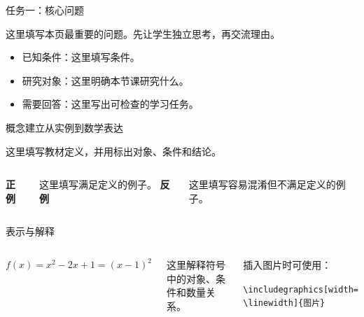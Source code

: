\documentclass[UTF8,aspectratio=169,11pt]{ctexbeamer}
\title{\CourseTitle}
\author{\TeacherName}
\date{\LessonDate}
\begin{document}
\CampusTitlePage


\begin{frame}{任务一：核心问题}
  \begin{questionbox}[观察与思考]
    这里填写本页最重要的问题。先让学生独立思考，再交流理由。
  \end{questionbox}

  \vspace{0.2cm}
  \begin{itemize}
    \item 已知条件：这里填写条件。
    \item 研究对象：这里明确本节课研究什么。
    \item 需要回答：这里写出可检查的学习任务。
  \end{itemize}
\end{frame}

\begin{frame}{概念建立}{从实例到数学表达}
  \begin{definitionbox}[定义]
    这里填写教材定义，并用标出对象、条件和结论。
  \end{definitionbox}

  \pause
  \begin{columns}[T,totalwidth=\textwidth]
      \textbf{正例}\par
      这里填写满足定义的例子。
      \textbf{反例}\par
      这里填写容易混淆但不满足定义的例子。
  \end{columns}
\end{frame}

\begin{frame}{表示与解释}
  \begin{columns}[T,totalwidth=\textwidth]
      \begin{questionbox}[符号语言]
        \[
          f(x)=x^2-2x+1=(x-1)^2
        \]
      \end{questionbox}
      这里解释符号中的对象、条件和数量关系。

      \begin{definitionbox}[图形或表格区域]
        插入图片时可使用：

        \medskip
        {\footnotesize\texttt{\textbackslash includegraphics[width=}\\
        \texttt{\textbackslash linewidth]\{图片\}}}
      \end{definitionbox}
  \end{columns}
\end{frame}
\end{document}
